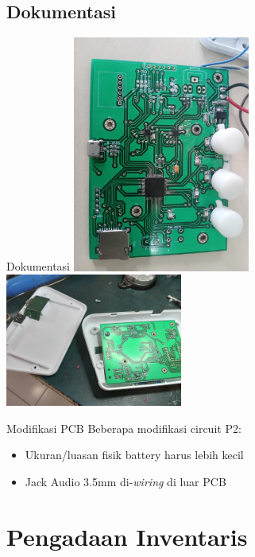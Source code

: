 \documentclass[table,dvipsnames]{beamer}
\begin{document}
	\begin{frame}
		\subsection{Dokumentasi}
		\begin{exampleblock}{Dokumentasi}
			\includegraphics[width=165pt]{images/pack_open0}
			\includegraphics[width=165pt]{images/pack_open1}
		\end{exampleblock}

		\begin{exampleblock}{Modifikasi PCB}
			Beberapa modifikasi circuit P2:
			\begin{itemize}
				\item Ukuran/luasan fisik battery harus lebih kecil
				\item Jack Audio 3.5mm di-\textit{wiring} di luar PCB
			\end{itemize}
		\end{exampleblock}
	\end{frame}

	\section{Pengadaan Inventaris}
\end{document}
